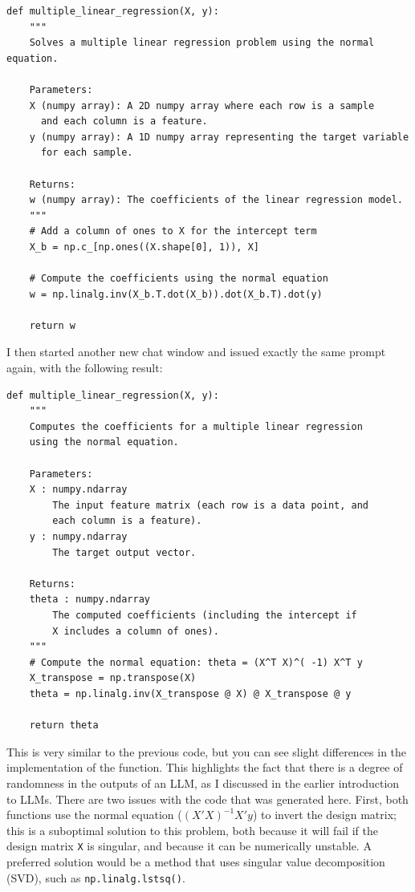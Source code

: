 \begin{lstlisting}
def multiple_linear_regression(X, y):
    """
    Solves a multiple linear regression problem using the normal equation.
    
    Parameters:
    X (numpy array): A 2D numpy array where each row is a sample 
      and each column is a feature.
    y (numpy array): A 1D numpy array representing the target variable 
      for each sample.
    
    Returns:
    w (numpy array): The coefficients of the linear regression model.
    """
    # Add a column of ones to X for the intercept term
    X_b = np.c_[np.ones((X.shape[0], 1)), X]
    
    # Compute the coefficients using the normal equation
    w = np.linalg.inv(X_b.T.dot(X_b)).dot(X_b.T).dot(y)
    
    return w
\end{lstlisting}

I then started another new chat window and issued exactly the same prompt again, with the following result:

\begin{lstlisting}
def multiple_linear_regression(X, y):
    """
    Computes the coefficients for a multiple linear regression 
    using the normal equation.
    
    Parameters:
    X : numpy.ndarray
        The input feature matrix (each row is a data point, and 
        each column is a feature).
    y : numpy.ndarray
        The target output vector.

    Returns:
    theta : numpy.ndarray
        The computed coefficients (including the intercept if 
        X includes a column of ones).
    """
    # Compute the normal equation: theta = (X^T X)^( -1) X^T y
    X_transpose = np.transpose(X)
    theta = np.linalg.inv(X_transpose @ X) @ X_transpose @ y
    
    return theta
\end{lstlisting}

This is very similar to the previous code, but you can see slight differences in the implementation of the function.
This highlights the fact that there is a degree of randomness in the outputs of an LLM, as I discussed in the earlier introduction to LLMs.
There are two issues with the code that was generated here.
First, both functions use the normal equation ($(X'X)^{ -1}X'y$) to invert the design matrix; this is a suboptimal solution to this problem, both because it will fail if the design matrix \texttt{X} is singular, and because it can be numerically unstable. A preferred solution would be a method that uses singular value decomposition (SVD), such as \texttt{np.linalg.lstsq()}.

